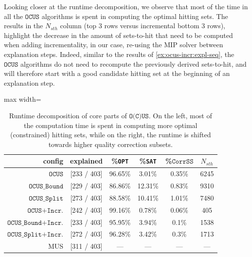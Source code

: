 \documentclass[twoside,11pt]{article}
\newcommand\mm[1]{\ensuremath{#1}\xspace}
\newcommand\call[1]{\mm{\texttt{#1}}}
\newcommand\sat{\texttt{{SAT}}\xspace}
\newcommand\comus{\mm{\call{OCUS}}}
\newcommand{\comusbound}{\mm{\call{OCUS\_Bound}}}
\newcommand\comusincr{\mm{\call{OCUS+Incr.}}}
\newcommand\ousbiter{\mm{\call{OCUS\_Split}}}
\newcommand\ousbincr{\mm{\call{OCUS\_Bound+Incr.}}}
\newcommand\ousbiterincr{\mm{\call{OCUS\_Split+Incr.}}}
\newcommand\corrss{\mm{\call{CorrSS}}}
\begin{document}
Looking closer at the runtime decomposition, we observe that most of the time in all the \comus algorithms is spent in computing the optimal hitting sets.
The results in the $N_{sth}$ column (top 3 rows versus incremental bottom 3 rows), highlight the decrease in the amount of sets-to-hit that need to be computed when adding incrementality, in our case, re-using the MIP solver between explanation steps. 
Indeed, similar to the results of \cref{ex:ocus-incr:expl-seq}, the \comus algorithms do not need to recompute the previously derived sets-to-hit, and will therefore start with a good candidate hitting set at the beginning of an explanation step.

\begin{table}[!h]
	\centering
	\begin{adjustbox}{max width=\textwidth}
		\begin{tabular}{r|c|c|c|c|c}
			\textbf{config}             &  explained  &  \%\texttt{OPT} &   \%\sat & \%\corrss &  $N_{sth}$ \\ \midrule
			\comus                      & [233 / 403] &          96.65\% &  3.01\% & 0.35\% &      6245     \\
			\comusbound                 & [229 / 403] &          86.86\% & 12.31\% & 0.83\% &      9310     \\
			\ousbiter                       & [273 / 403] &          88.58\% & 10.41\% & 1.01\% &      7480     \\\midrule
			\comusincr                  & [242 / 403] &          99.16\% &  0.78\% & 0.06\% &       405     \\
			\ousbincr  			        & [233 / 403] &          95.95\% &  3.94\% &  0.1\% &      1538     \\
			\ousbiterincr               & [272 / 403] &          96.28\% &  3.42\% &  0.3\% &      1713     \\\midrule
			MUS                          & [311 / 403] &              --- &     --- &    --- &       ---    \\
		\end{tabular}
	\end{adjustbox}
	\caption{Runtime decomposition of core parts of \call{O(C)US}. On the left, most of the computation time is spent in computing more optimal (constrained) hitting sets, while on the right, the runtime is shifted towards higher quality correction subsets.}
	\label{tab:runtime-decomposition}
\end{table}
\end{document}
